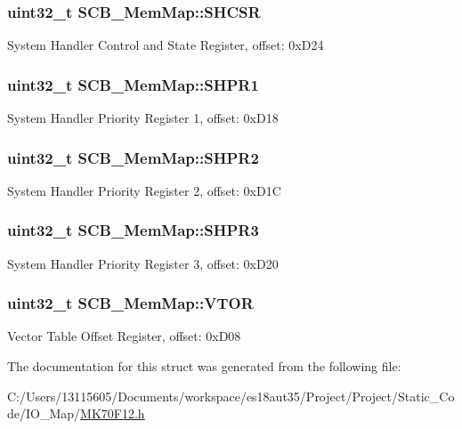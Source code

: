 \subsubsection[{S\+H\+C\+S\+R}]{\setlength{\rightskip}{0pt plus 5cm}uint32\+\_\+t S\+C\+B\+\_\+\+Mem\+Map\+::\+S\+H\+C\+S\+R}\label{struct_s_c_b___mem_map_ae2b73d4b9744b878527466ec57dbfdb7}
System Handler Control and State Register, offset\+: 0x\+D24 \hypertarget{struct_s_c_b___mem_map_afe02d5ca0102ec35b79172d453854ed0}{}
\subsubsection[{S\+H\+P\+R1}]{\setlength{\rightskip}{0pt plus 5cm}uint32\+\_\+t S\+C\+B\+\_\+\+Mem\+Map\+::\+S\+H\+P\+R1}\label{struct_s_c_b___mem_map_afe02d5ca0102ec35b79172d453854ed0}
System Handler Priority Register 1, offset\+: 0x\+D18 \hypertarget{struct_s_c_b___mem_map_a1636322022eb10e4acedf40018708b68}{}
\subsubsection[{S\+H\+P\+R2}]{\setlength{\rightskip}{0pt plus 5cm}uint32\+\_\+t S\+C\+B\+\_\+\+Mem\+Map\+::\+S\+H\+P\+R2}\label{struct_s_c_b___mem_map_a1636322022eb10e4acedf40018708b68}
System Handler Priority Register 2, offset\+: 0x\+D1\+C \hypertarget{struct_s_c_b___mem_map_a8ac3a3b8dd23fb279640b98a95fb796a}{}
\subsubsection[{S\+H\+P\+R3}]{\setlength{\rightskip}{0pt plus 5cm}uint32\+\_\+t S\+C\+B\+\_\+\+Mem\+Map\+::\+S\+H\+P\+R3}\label{struct_s_c_b___mem_map_a8ac3a3b8dd23fb279640b98a95fb796a}
System Handler Priority Register 3, offset\+: 0x\+D20 \hypertarget{struct_s_c_b___mem_map_aa327db1d9948595498fba43acc8d336b}{}
\subsubsection[{V\+T\+O\+R}]{\setlength{\rightskip}{0pt plus 5cm}uint32\+\_\+t S\+C\+B\+\_\+\+Mem\+Map\+::\+V\+T\+O\+R}\label{struct_s_c_b___mem_map_aa327db1d9948595498fba43acc8d336b}
Vector Table Offset Register, offset\+: 0x\+D08 

The documentation for this struct was generated from the following file\+:\begin{DoxyCompactItemize}
\item 
C\+:/\+Users/13115605/\+Documents/workspace/es18aut35/\+Project/\+Project/\+Static\+\_\+\+Code/\+I\+O\+\_\+\+Map/\hyperlink{_m_k70_f12_8h}{M\+K70\+F12.\+h}\end{DoxyCompactItemize}
